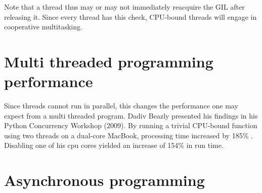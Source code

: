 Note that a thread thus may or may not immediately reacquire the GIL after releasing it.
Since every thread has this check, CPU-bound threads will engage in cooperative multitasking.

\section{Multi threaded programming performance}

Since threads cannot run in parallel, this changes the performance one may expect from a multi threaded program.
Dadiv Beazly presented his findings in his Python Concurrency Workshop (2009).
By running a trivial CPU-bound function using two threads on a dual-core MacBook, processing time increased by 185\% \cite{beazley2009inside}.
Disabling one of his cpu cores yielded an increase of 154\% in run time.




\section{Asynchronous programming}
